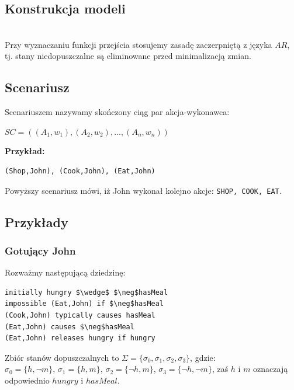 \documentclass{article}
\begin{document}
\subsection{Konstrukcja modeli}\mbox{}\\
Przy wyznaczaniu funkcji przejścia stosujemy zasadę zaczerpniętą z języka $AR$, tj. stany niedopuszczalne są eliminowane przed minimalizacją zmian.
\subsection{Scenariusz}
Scenariuszem nazywamy skończony ciąg par akcja-wykonawca:
\begin{center}
$SC=((A_1,w_1),(A_2,w_2),...,(A_n,w_n))$
\end{center}
\textbf{Przykład:}
\begin{lstlisting}[mathescape=true]
(Shop,John), (Cook,John), (Eat,John)
\end{lstlisting}
Powyższy scenariusz mówi, iż John wykonał kolejno akcje: \texttt{SHOP, COOK, EAT}.


\subsection{Przykłady}
\subsubsection{Gotujący John}

Rozważmy następującą dziedzinę:
\bigskip
{}
\begin{lstlisting}[mathescape=true]
initially hungry $\wedge$ $\neg$hasMeal 
impossible (Eat,John) if $\neg$hasMeal 
(Cook,John) typically causes hasMeal
(Eat,John) causes $\neg$hasMeal 
(Eat,John) releases hungry if hungry
\end{lstlisting}
Zbiór stanów dopuszczalnych to $\Sigma=\{\sigma_{0},\sigma_{1},\sigma_{2},\sigma_{3}\}$, gdzie:\\
$\sigma_{0}=\{h,\neg m\}$, $\sigma_{1}=\{h, m\}$, $\sigma_{2}=\{\neg h, m\}$, $\sigma_{3}=\{\neg h,\neg m\}$, zaś $h$ i $m$ oznaczają odpowiednio $hungry$ i $hasMeal$.\\
\end{document}

